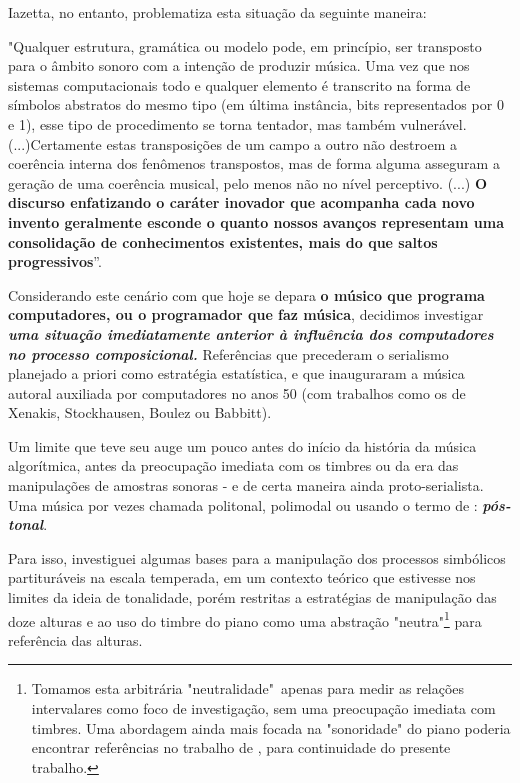 \documentclass[
	12pt,				%
	openright,			%
	twoside,			%
	a4paper,			%
	english,			%
	french,				%
	spanish,			%
	brazil				%
	]{abntex2}
\begin{document}
Iazetta, no entanto, problematiza esta situação da seguinte maneira:


\begin{citacao}
"Qualquer estrutura, gramática ou modelo pode, em princípio, ser transposto para o âmbito sonoro com a intenção de produzir música. Uma vez que nos sistemas computacionais todo e qualquer elemento é transcrito na forma de símbolos abstratos do mesmo tipo (em última instância, bits representados por 0 e 1), esse tipo de procedimento se torna tentador, mas também vulnerável.(...)Certamente estas transposições de um campo a outro não destroem a coerência interna dos fenômenos transpostos, mas de forma alguma asseguram a  geração de uma coerência musical, pelo menos não no nível perceptivo.
(...)
\textbf{O discurso enfatizando o caráter inovador que acompanha cada novo invento geralmente esconde o quanto nossos avanços representam uma consolidação  de conhecimentos existentes, mais do que saltos progressivos}”. \cite[p. 151-153, grifo nosso.]{iazzetta2009musica}
\end{citacao}

Considerando este cenário com que hoje se depara \textbf{o músico que programa computadores, ou o programador que faz música}, decidimos investigar \textit{\textbf{uma situação imediatamente anterior à influência dos computadores no processo composicional.}} Referências que precederam o serialismo planejado a priori como estratégia estatística, e que inauguraram a música autoral auxiliada por computadores no anos 50 (com trabalhos como os de Xenakis, Stockhausen, Boulez ou Babbitt).

Um limite que teve seu auge um pouco antes do início da história da música algorítmica, antes da preocupação imediata com os timbres ou da era das manipulações de amostras sonoras - e de certa maneira ainda proto-serialista. Uma música por vezes chamada politonal, polimodal ou usando o termo de : \textit{\textbf{pós-tonal}}. 

Para isso, investiguei algumas bases para a manipulação dos processos simbólicos partituráveis na escala temperada, em um contexto teórico que estivesse nos limites da ideia de tonalidade, porém restritas a estratégias de manipulação das doze alturas e ao uso do timbre do piano como uma abstração "neutra"\footnote{Tomamos esta arbitrária "neutralidade"\ apenas para medir as relações intervalares como foco de investigação, sem uma preocupação imediata com timbres. Uma abordagem ainda mais focada na "sonoridade" do piano poderia encontrar referências no trabalho de , para continuidade do presente trabalho. } para referência das alturas.
\end{document}
